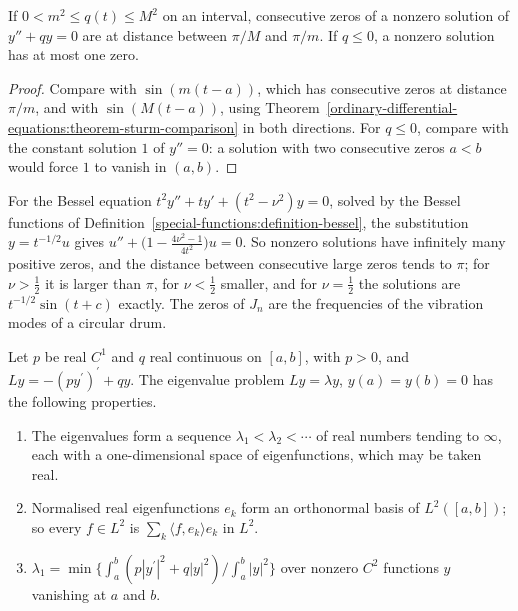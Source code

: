 \begin{corollary}\label{ordinary-differential-equations:corollary-zero-spacing}
If $0 < m^2 \leq q(t) \leq M^2$ on an interval, consecutive zeros of a nonzero solution of $y'' + qy = 0$ are at distance between $\pi/M$ and $\pi/m$. If $q \leq 0$, a nonzero solution has at most one zero.
\end{corollary}

\begin{proof}
Compare with $\sin(m(t - a))$, which has consecutive zeros at distance $\pi/m$, and with $\sin(M(t - a))$, using Theorem~\ref{ordinary-differential-equations:theorem-sturm-comparison} in both directions. For $q \leq 0$, compare
with the constant solution $1$ of $y'' = 0$: a solution with two consecutive zeros $a < b$ would force $1$ to vanish in $(a, b)$.
\end{proof}

\begin{example}\label{ordinary-differential-equations:example-bessel-zeros}
For the Bessel equation $t^2y'' + ty' + (t^2 - \nu^2)y = 0$, solved by the Bessel functions of Definition~\ref{special-functions:definition-bessel}, the substitution $y = t^{-1/2}u$ gives $u'' + \bigl(1 - \frac{4\nu^2 - 1}{4t^2}\bigr)u = 0$. So nonzero solutions have infinitely many positive zeros, and the distance between
consecutive large zeros tends to $\pi$; for $\nu > \frac12$ it is larger than $\pi$, for $\nu < \frac12$ smaller, and for $\nu = \frac12$ the solutions are $t^{-1/2}\sin(t + c)$ exactly. The zeros of $J_n$ are the frequencies of the vibration modes of a circular drum.
\end{example}

\begin{theorem}\label{ordinary-differential-equations:theorem-sturm-liouville}
Let $p$ be real $C^1$ and $q$ real continuous on $[a, b]$, with $p > 0$, and $Ly = -(py^{\prime})^{\prime} + qy$. The eigenvalue problem $Ly = \lambda y$, $y(a) = y(b) = 0$ has the following properties.
\begin{enumerate}
\item The eigenvalues form a sequence $\lambda_1 < \lambda_2 < \cdots$ of real numbers tending to $\infty$, each with a one-dimensional space of eigenfunctions, which may be taken real.
\item Normalised real eigenfunctions $e_k$ form an orthonormal basis of $L^2([a, b])$; so every $f \in L^2$ is $\sum_k\langle f, e_k\rangle e_k$ in $L^2$.
\item $\lambda_1 = \min\bigl\{\int_a^b(p|y^{\prime}|^2 + q|y|^2) / \int_a^b|y|^2\bigr\}$ over nonzero $C^2$ functions $y$ vanishing at $a$ and $b$.
\end{enumerate}
\end{theorem}

